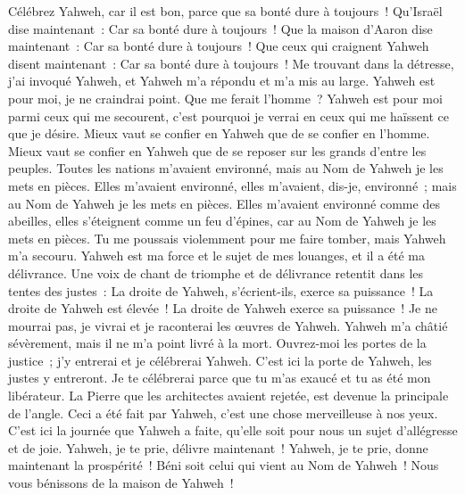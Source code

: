 \begin{multicols}{2}
\VerseOne{}Célébrez Yahweh, car il est bon, parce que sa bonté dure à toujours~!
Qu'Israël dise maintenant~: Car sa bonté dure à toujours~!
Que la maison d'Aaron dise maintenant~: Car sa bonté dure à toujours~!
Que ceux qui craignent Yahweh disent maintenant~: Car sa bonté dure à toujours~!
Me trouvant dans la détresse, j'ai invoqué Yahweh, et Yahweh m'a répondu et m'a mis au large.
Yahweh est pour moi, je ne craindrai point. Que me ferait l'homme~?
Yahweh est pour moi parmi ceux qui me secourent, c'est pourquoi je verrai en ceux qui me haïssent ce que je désire.
Mieux vaut se confier en Yahweh que de se confier en l'homme.
Mieux vaut se confier en Yahweh que de se reposer sur les grands d'entre les peuples.
Toutes les nations m'avaient environné, mais au Nom de Yahweh je les mets en pièces.
Elles m'avaient environné, elles m'avaient, dis-je, environné~; mais au Nom de Yahweh je les mets en pièces.
Elles m'avaient environné comme des abeilles, elles s'éteignent comme un feu d'épines, car au Nom de Yahweh je les mets en pièces.
Tu me poussais violemment pour me faire tomber, mais Yahweh m'a secouru.
Yahweh est ma force et le sujet de mes louanges, et il a été ma délivrance.
Une voix de chant de triomphe et de délivrance retentit dans les tentes des justes~: La droite de Yahweh, s'écrient-ils, exerce sa puissance~!
La droite de Yahweh est élevée~! La droite de Yahweh exerce sa puissance~!
Je ne mourrai pas, je vivrai et je raconterai les œuvres de Yahweh.
Yahweh m'a châtié sévèrement, mais il ne m'a point livré à la mort.
Ouvrez-moi les portes de la justice~; j'y entrerai et je célébrerai Yahweh.
C'est ici la porte de Yahweh, les justes y entreront.
Je te célébrerai parce que tu m'as exaucé et tu as été mon libérateur.
La Pierre que les architectes avaient rejetée, est devenue la principale de l'angle.
Ceci a été fait par Yahweh, c'est une chose merveilleuse à nos yeux.
C'est ici la journée que Yahweh a faite, qu'elle soit pour nous un sujet d'allégresse et de joie.
Yahweh, je te prie, délivre maintenant~! Yahweh, je te prie, donne maintenant la prospérité~!
Béni soit celui qui vient au Nom de Yahweh~! Nous vous bénissons de la maison de Yahweh~!

\end{multicols}
